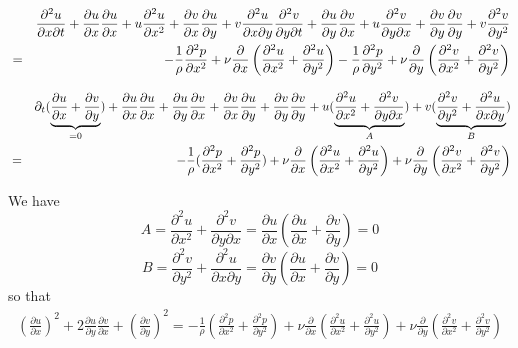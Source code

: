 \begin{eqnarray}
&&\frac{\partial^2 u}{\partial x \partial t}  
+ \frac{\partial u}{\partial x} \frac{\partial u}{\partial x}+ u \frac{\partial^2 u}{\partial x^2}
+ \frac{\partial v}{\partial x} \frac{\partial u}{\partial y}+ v \frac{\partial^2 u}{\partial x\partial y}
\frac{\partial^2 v}{\partial y \partial t}  
+ \frac{\partial u}{\partial y} \frac{\partial v}{\partial x}+ u \frac{\partial^2 v}{\partial y\partial x}
+ \frac{\partial v}{\partial y} \frac{\partial v}{\partial y}+ v \frac{\partial^2 v}{\partial y^2} \nonumber\\
&=&
-\frac{1}{\rho} \frac{\partial^2 p}{\partial x^2} 
+ \nu \frac{\partial }{\partial x} \left( \frac{\partial^2 u}{\partial x^2} + \frac{\partial^2 u}{\partial y^2} \right) 
-\frac{1}{\rho} \frac{\partial^2 p}{\partial y^2} 
+ \nu \frac{\partial }{\partial y}  \left( \frac{\partial^2 v}{\partial x^2} + \frac{\partial^2 v}{\partial y^2} \right) 
\end{eqnarray}

\begin{eqnarray}
&&\partial_t ( \underbrace{\frac{\partial u}{\partial x } +  \frac{\partial v}{\partial y } }_{=0}  )
+ \frac{\partial u}{\partial x} \frac{\partial u}{\partial x}
+ \frac{\partial u}{\partial y} \frac{\partial v}{\partial x}
+ \frac{\partial v}{\partial x} \frac{\partial u}{\partial y}
+ \frac{\partial v}{\partial y} \frac{\partial v}{\partial y}
+ u (\underbrace{\frac{\partial^2 u}{\partial x^2} +  \frac{\partial^2 v}{\partial y\partial x}}_{A} )
+ v (\underbrace{\frac{\partial^2 v}{\partial y^2} +  \frac{\partial^2 u}{\partial x\partial y}}_{B} ) \nonumber\\
&=&
-\frac{1}{\rho} (\frac{\partial^2 p}{\partial x^2} + \frac{\partial^2 p}{\partial y^2})
+ \nu \frac{\partial }{\partial x} \left( \frac{\partial^2 u}{\partial x^2} + \frac{\partial^2 u}{\partial y^2} \right) 
+ \nu \frac{\partial }{\partial y}  \left( \frac{\partial^2 v}{\partial x^2} + \frac{\partial^2 v}{\partial y^2} \right) 
\end{eqnarray}


We have
\[
A = 
\frac{\partial^2 u}{\partial x^2} +  \frac{\partial^2 v}{\partial y\partial x}
=\frac{\partial u}{\partial x} ( \frac{\partial u}{\partial x}+ \frac{\partial v}{\partial y}) = 0
\]
\[
B 
=\frac{\partial^2 v}{\partial y^2}  +  \frac{\partial^2 u}{\partial x\partial y}
=\frac{\partial v}{\partial y} (\frac{\partial u}{\partial x} + \frac{\partial v}{\partial y}) =0
\]
so that 
\begin{eqnarray}
(\frac{\partial u}{\partial x})^2 
+ 2\frac{\partial u}{\partial y} \frac{\partial v}{\partial x}
+ (\frac{\partial v}{\partial y} )^2
=
-\frac{1}{\rho} (\frac{\partial^2 p}{\partial x^2} + \frac{\partial^2 p}{\partial y^2})
+ \nu \frac{\partial }{\partial x} \left( \frac{\partial^2 u}{\partial x^2} + \frac{\partial^2 u}{\partial y^2} \right) 
+ \nu \frac{\partial }{\partial y}  \left( \frac{\partial^2 v}{\partial x^2} + \frac{\partial^2 v}{\partial y^2} \right) 
\end{eqnarray}



